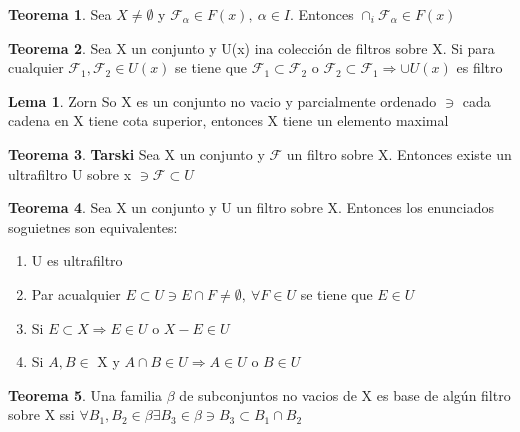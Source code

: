 \documentclass{article}
\theoremstyle{definition}
\newtheorem{theorem}{Teorema}[section]
\newtheorem{lemma}{Lema}[section]
\begin{document}
\begin{theorem}
	Sea $X\neq\emptyset$ y $\mathcal{F}_{\alpha}\in F(x),\ \alpha\in I$. Entonces $\cap_i\mathcal{F}_{\alpha}\in F(x)$
\end{theorem}


\begin{theorem}
	Sea X un conjunto y U(x) ina colección de filtros sobre X. Si para cualquier $\mathcal{F}_1,\mathcal{F}_2\in U(x)$ se tiene que $\mathcal{F}_1\subset\mathcal{F}_2$ o $\mathcal{F}_2\subset\mathcal{F}_1\Rightarrow \cup U(x)$ es filtro
\end{theorem}


\begin{lemma}{Zorn}
	So X es un conjunto no vacio y parcialmente ordenado $\ni$ cada cadena en X tiene cota superior, entonces X tiene un elemento maximal
\end{lemma}


\begin{theorem}{\textbf{Tarski}}
	Sea X un conjunto y $\mathcal{F}$ un filtro sobre X. Entonces existe un ultrafiltro U sobre x $\ni \mathcal{F}\subset U$
\end{theorem}


\begin{theorem}
	Sea X un conjunto y U un filtro sobre X. Entonces los enunciados soguietnes son equivalentes:
	\begin{enumerate}
		\item U es ultrafiltro
		\item Par acualquier $E\subset U\ni E\cap F\neq \emptyset,\ \forall F\in U$ se tiene que $E\in U$
		\item Si $E\subset X\Rightarrow E\in U$ o $X-E\in U$
		\item Si $A, B\in$ X y $ A\cap B\in U\Rightarrow A\in U$ o $ B\in U$
	\end{enumerate}
\end{theorem}


\begin{theorem}
	Una familia $\beta$ de subconjuntos no vacios de X es base de algún filtro sobre X ssi $\forall B_1,B_2 \in \beta\exists B_3\in\beta\ni B_3\subset B_1\cap B_2$
\end{theorem}

\end{document}
